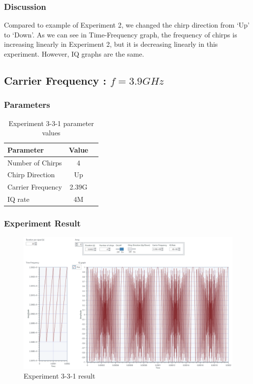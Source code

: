     \subsubsection*{Discussion}
    Compared to example of Experiment 2, we changed the chirp direction from ‘Up’ to ‘Down’. As we can see in Time-Frequency graph, the frequency of chirps is increasing linearly in Experiment 2, but it is decreasing linearly in this experiment. However, IQ graphs are the same. \\
\clearpage
    
\subsection{Carrier Frequency : $f = 3.9GHz$}
    \subsubsection*{Parameters}
    \begin{table}[!h]\centering
        \hspace{10mm}
        \begin{tabular}{|l|c|c|}
        \hline
        \multicolumn{1}{|l|}{Parameter} & \multicolumn{1}{l|}{Value} \\
        \hline
        Number of Chirps & 4 \\ 
        \hline
        Chirp Direction & Up \\ 
        \hline
        Carrier Frequency & 2.39G \\ 
        \hline
        IQ rate & 4M \\ 
        \hline
        \end{tabular}
        \caption{Experiment 3-3-1 parameter values}
    \end{table}
    
    \subsubsection*{Experiment Result}
    \vspace{-4mm}  
    \begin{figure}[!h]\raggedleft
    \hspace{15mm}
		\includegraphics[width=.95\textwidth]{image/week03/3-3-1.png}
		\caption{\footnotesize Experiment 3-3-1 result}
		\vspace{-10pt}
    \end{figure}
